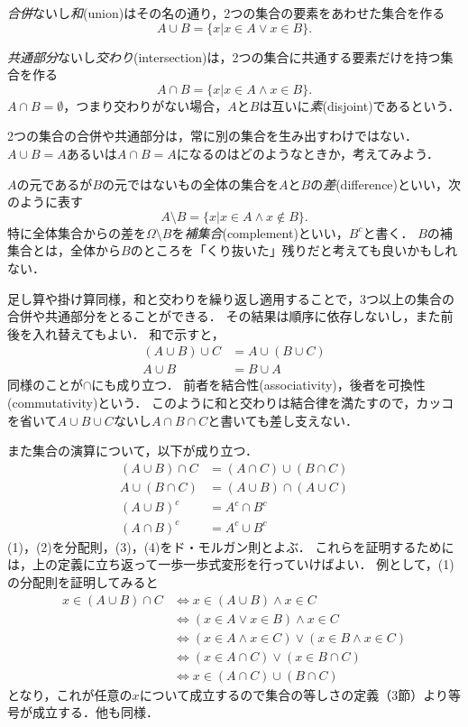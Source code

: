 \documentclass[11pt,a4paper]{jsarticle}
\begin{document}
\emph{合併}ないし\emph{和}(union)はその名の通り，2つの集合の要素をあわせた集合を作る
\[
 A \cup B = \{ x | x \in A \vee x \in B\} .
\]


\emph{共通部分}ないし\emph{交わり}(intersection)は，2つの集合に共通する要素だけを持つ集合を作る
\[
 A \cap B = \{ x | x \in A \wedge x \in B\}.
\]
$A \cap B = \emptyset$，つまり交わりがない場合，$A$と$B$は互いに\emph{素}(disjoint)であるという．

\begin{attn}
 2つの集合の合併や共通部分は，常に別の集合を生み出すわけではない．$A \cup B = A$あるいは$A \cap B = A$になるのはどのようなときか，考えてみよう．
\end{attn}


$A$の元であるが$B$の元ではないもの全体の集合を$A$と$B$の\emph{差}(difference)といい，次のように表す
\[
 A \setminus B = \{ x | x \in A \wedge x \not\in B\}.
\]
特に全体集合からの差を$\Omega \setminus B$を\emph{補集合}(complement)といい，$B^c$と書く．
$B$の補集合とは，全体から$B$のところを「くり抜いた」残りだと考えても良いかもしれない．

足し算や掛け算同様，和と交わりを繰り返し適用することで，3つ以上の集合の合併や共通部分をとることができる．
その結果は順序に依存しないし，また前後を入れ替えてもよい．
和で示すと，
\begin{align*}
 (A \cup B) \cup C & = A \cup (B \cup C) \\
 A \cup B & = B \cup A
\end{align*}
同様のことが$\cap$にも成り立つ．
前者を結合性(associativity)，後者を可換性(commutativity)という．
このように和と交わりは結合律を満たすので，カッコを省いて$A \cup B \cup C$ないし$A \cap B \cap C$と書いても差し支えない．

また集合の演算について，以下が成り立つ．
\begin{align}
(A \cup B) \cap C &= (A \cap C) \cup (B \cap C) \\
A \cup (B \cap C) &= (A \cup B) \cap (A \cup C) \\
(A \cup B)^c &= A^c \cap B^c \\
(A \cap B)^c &= A^c \cup B^c
\end{align}
(1)，(2)を分配則，(3)，(4)をド・モルガン則とよぶ．
これらを証明するためには，上の定義に立ち返って一歩一歩式変形を行っていけばよい．
例として，(1)の分配則を証明してみると
\begin{align*}
x \in (A \cup B) \cap C &\iff x \in (A \cup B) \wedge x \in C \\
&\iff  (x \in A \vee x \in B) \wedge x \in C \\
&\iff  (x \in A \wedge x \in C) \vee (x \in B \wedge x \in C) \\
&\iff  (x \in A \cap C) \vee (x \in B \cap C) \\
&\iff  x \in (A \cap C) \cup (B \cap C) 
\end{align*}
となり，これが任意の$x$について成立するので集合の等しさの定義（3節）より等号が成立する．他も同様．
\end{document}
